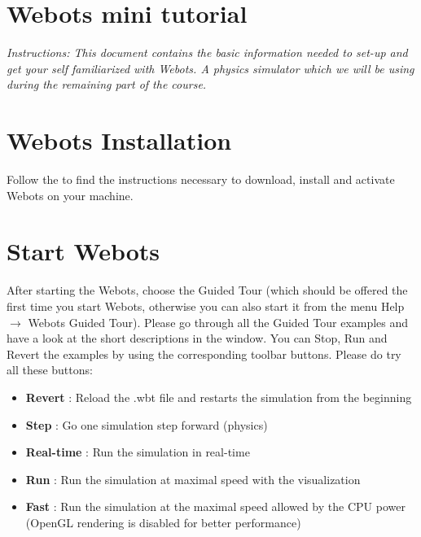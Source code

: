 \documentclass{cmc}
\begin{document}
\pagestyle{fancy}
 

\section*{Webots mini tutorial}

\textit{Instructions: This document contains the basic information
  needed to set-up and get your self familiarized with Webots.  A
  physics simulator which we will be using during the remaining part
  of the course.}

\section{Webots Installation}
\label{sec:webots-installation}

Follow the
\href{https://biorob.epfl.ch/page-36417-en.html#faq-169995}{}
to find the instructions necessary to download, install and activate
Webots on your machine.

\section{Start Webots}
\label{sec:start-webots}

After starting the Webots, choose the Guided Tour (which should be
offered the first time you start Webots, otherwise you can also start
it from the menu Help $\rightarrow$ Webots Guided Tour). Please go
through all the Guided Tour examples and have a look at the short
descriptions in the window. You can Stop, Run and Revert the examples
by using the corresponding toolbar buttons. Please do try all these
buttons:
\begin{itemize}
\item \textbf{Revert} : Reload the .wbt file and restarts the
  simulation from the beginning
\item \textbf{Step} : Go one simulation step forward (physics)
\item \textbf{Real-time} : Run the simulation in real-time
\item \textbf{Run} : Run the simulation at maximal speed with the
  visualization
\item \textbf{Fast} : Run the simulation at the maximal speed allowed
  by the CPU power (OpenGL rendering is disabled for better
  performance)
\end{itemize}
  
\end{document}
